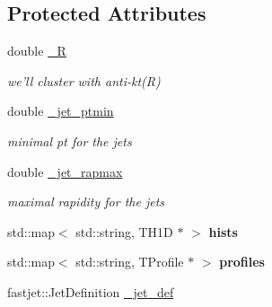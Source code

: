 \subsection*{Protected Attributes}
\begin{CompactItemize}
\item 
\hypertarget{classTestFilterAnalysis_bb4660cbf394ce21f78a77cbd136fb72}{
double \hyperlink{classTestFilterAnalysis_bb4660cbf394ce21f78a77cbd136fb72}{\_\-R}}
\label{classTestFilterAnalysis_bb4660cbf394ce21f78a77cbd136fb72}

\begin{CompactList}\small\item\em we'll cluster with anti-kt(R) \item\end{CompactList}\item 
\hypertarget{classTestFilterAnalysis_c5bcf1f08052dc6166f45c1b6cabd499}{
double \hyperlink{classTestFilterAnalysis_c5bcf1f08052dc6166f45c1b6cabd499}{\_\-jet\_\-ptmin}}
\label{classTestFilterAnalysis_c5bcf1f08052dc6166f45c1b6cabd499}

\begin{CompactList}\small\item\em minimal pt for the jets \item\end{CompactList}\item 
\hypertarget{classTestFilterAnalysis_6ef499c7b3af50fee4fe76f740050270}{
double \hyperlink{classTestFilterAnalysis_6ef499c7b3af50fee4fe76f740050270}{\_\-jet\_\-rapmax}}
\label{classTestFilterAnalysis_6ef499c7b3af50fee4fe76f740050270}

\begin{CompactList}\small\item\em maximal rapidity for the jets \item\end{CompactList}\item 
\hypertarget{classTestFilterAnalysis_a64b6fe183bac3ec7f7ae5abe55c98ed}{
std::map$<$ std::string, TH1D $\ast$ $>$ \textbf{hists}}
\label{classTestFilterAnalysis_a64b6fe183bac3ec7f7ae5abe55c98ed}

\item 
\hypertarget{classTestFilterAnalysis_98dfe3975ac2dded947799a3498bbd28}{
std::map$<$ std::string, TProfile $\ast$ $>$ \textbf{profiles}}
\label{classTestFilterAnalysis_98dfe3975ac2dded947799a3498bbd28}

\item 
\hypertarget{classTestFilterAnalysis_76f976b8179859c78abc94a903ed8e56}{
fastjet::Jet\-Definition \hyperlink{classTestFilterAnalysis_76f976b8179859c78abc94a903ed8e56}{\_\-jet\_\-def}}
\label{classTestFilterAnalysis_76f976b8179859c78abc94a903ed8e56}


\end{CompactItemize}
